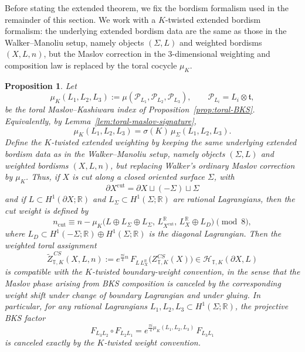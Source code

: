 \documentclass[12pt]{amsart}
\numberwithin{equation}{section}
\newtheorem{prop}[theorem]{Proposition}
\begin{document}
Before stating the extended theorem, we fix the bordism formalism used in the remainder
of this section. We work with a \(K\)-twisted  extended bordism formalism:
the underlying extended bordism data are the same as those in the Walker--Manoliu setup,
namely objects \((\Sigma,L)\) and weighted bordisms \((X,L,n)\), but the Maslov
correction in the \(3\)-dimensional weighting and composition law is replaced by the toral
cocycle \(\mu_K\).


\begin{prop}
\label{prop:K-twisted-Walker}
Let
\[
\mu_K(L_1,L_2,L_3)
:=
\mu(\mathcal P_{L_1},\mathcal P_{L_2},\mathcal P_{L_3}),
\qquad
\mathcal P_{L_i}=L_i\otimes \mathfrak t,
\]
be the toral Maslov--Kashiwara index of Proposition~\ref{prop:toral-BKS}. Equivalently,
by Lemma~\ref{lem:toral-maslov-signature},
\[
\mu_K(L_1,L_2,L_3)=\sigma(K)\,\mu_\Sigma(L_1,L_2,L_3).
\]
Define the \(K\)-twisted extended weighting by keeping the same underlying extended
bordism data as in the Walker--Manoliu setup, namely objects \((\Sigma,L)\) and
weighted bordisms \((X,L,n)\), but replacing Walker's ordinary Maslov correction by
\(\mu_K\). Thus, if \(X\) is cut
along a closed oriented surface \(\Sigma\), with
\[
\partial X^{\mathrm{cut}}=\partial X\sqcup (-\Sigma)\sqcup \Sigma
\]
and if \(L\subset H^1(\partial X;\mathbb R)\) and \(L_\Sigma\subset H^1(\Sigma;\mathbb R)\) are
rational Lagrangians, then the cut weight is defined by
\begin{equation}
\label{eq:K-twisted-ncut}
n_{\mathrm{cut}}
\equiv
n-\mu_K\!\bigl(L\oplus L_\Sigma\oplus L_\Sigma,\,
L^{\mathbb R}_{X^{\mathrm{cut}}},\,
L^{\mathbb R}_{X}\oplus L_D\bigr)
\pmod 8,
\end{equation}
where \(L_D\subset H^1(-\Sigma;\mathbb R)\oplus H^1(\Sigma;\mathbb R)\) is the diagonal Lagrangian. Then the weighted toral assignment
\[
\widetilde Z^{\,CS}_{\mathbb T,K}(X,L,n)
:=
e^{\frac{\pi i}{4}n}\,
F_{L\,L_X^{\mathbb R}}\!\bigl(Z^{CS}_{\mathbb T,K}(X)\bigr)
\in \mathcal H_{\mathbb T,K}(\partial X,L)
\]
is compatible with the \(K\)-twisted boundary-weight convention, in the sense that
the Maslov phase arising from BKS composition is canceled by the corresponding
weight shift under change of boundary Lagrangian and under gluing. In particular, for any rational Lagrangians \(L_1,L_2,L_3\subset H^1(\Sigma;\mathbb R)\),
the projective BKS factor
\[
F_{L_3L_2}\circ F_{L_2L_1}
=
e^{\frac{\pi i}{4}\mu_K(L_1,L_2,L_3)}\,F_{L_3L_1}
\]
is canceled exactly by the \(K\)-twisted weight convention.
\end{prop}
\end{document}

